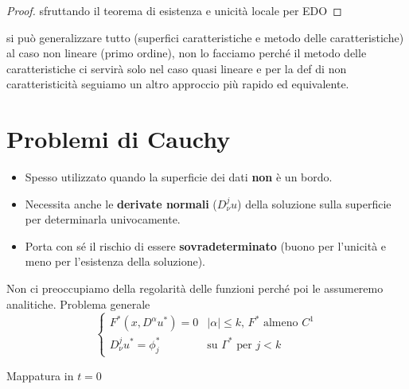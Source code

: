 \begin{theorem}
\end{theorem}
\begin{proof}
sfruttando il teorema di esistenza e unicità locale per EDO
\end{proof}

si può generalizzare tutto (superfici caratteristiche e metodo delle caratteristiche) al caso non lineare (primo ordine), non lo facciamo perché il metodo delle caratteristiche ci servirà solo nel caso quasi lineare e per la def di non caratteristicità seguiamo un altro approccio più rapido ed equivalente.

\newpage
\section{Problemi di Cauchy}
\begin{itemize}
\item Spesso utilizzato quando la superficie dei dati \textbf{non} è un bordo.
\item Necessita anche le \textbf{derivate normali} ($D^j_\nu u$) della soluzione sulla superficie per determinarla univocamente.
\item Porta con sé il rischio di essere \textbf{sovradeterminato} (buono per l'unicità e meno per l'esistenza della soluzione).
\end{itemize}

Non ci preoccupiamo della regolarità delle funzioni perché poi le assumeremo analitiche.
Problema generale
\begin{equation*}
\begin{cases}
F^*(x,D^\alpha u^*)=0 & |\alpha | \leq k, \, F^* \text{ almeno } C^1\\
D^j_\nu u^* = \phi_j^* & \text{su } \Gamma^* \text{ per }j<k 
\end{cases}
\end{equation*}



Mappatura in $t=0$

